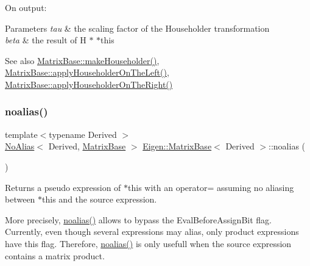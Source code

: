 On output\+: 
\begin{DoxyParams}{Parameters}
{\em tau} & the scaling factor of the Householder transformation \\
\hline
{\em beta} & the result of H $\ast$ {\ttfamily $\ast$this} \\
\hline
\end{DoxyParams}
\begin{DoxySeeAlso}{See also}
\mbox{\hyperlink{class_eigen_1_1_matrix_base_a13291e900f7e81ddc6e5b8802f82092b}{Matrix\+Base\+::make\+Householder()}}, \mbox{\hyperlink{class_eigen_1_1_matrix_base_a8f2c8059ef3f04cfa0c73b4c012db855}{Matrix\+Base\+::apply\+Householder\+On\+The\+Left()}}, \mbox{\hyperlink{class_eigen_1_1_matrix_base_ab3e52262b41fa40e194dda245e0f9675}{Matrix\+Base\+::apply\+Householder\+On\+The\+Right()}} 
\end{DoxySeeAlso}
\mbox{\label{class_eigen_1_1_matrix_base_a2c1085de7645f23f240876388457da0b}} 
\subsubsection{\texorpdfstring{noalias()}{noalias()}}
{\footnotesize\ttfamily template$<$typename Derived $>$ \\
\mbox{\hyperlink{class_eigen_1_1_no_alias}{No\+Alias}}$<$ Derived, \mbox{\hyperlink{class_eigen_1_1_matrix_base}{Matrix\+Base}} $>$ \mbox{\hyperlink{class_eigen_1_1_matrix_base}{Eigen\+::\+Matrix\+Base}}$<$ Derived $>$\+::noalias (\begin{DoxyParamCaption}{ }\end{DoxyParamCaption})}

\begin{DoxyReturn}{Returns}
a pseudo expression of {\ttfamily $\ast$this} with an operator= assuming no aliasing between {\ttfamily $\ast$this} and the source expression.
\end{DoxyReturn}
More precisely, \mbox{\hyperlink{class_eigen_1_1_matrix_base_a2c1085de7645f23f240876388457da0b}{noalias()}} allows to bypass the Eval\+Before\+Assign\+Bit flag. Currently, even though several expressions may alias, only product expressions have this flag. Therefore, \mbox{\hyperlink{class_eigen_1_1_matrix_base_a2c1085de7645f23f240876388457da0b}{noalias()}} is only usefull when the source expression contains a matrix product.

